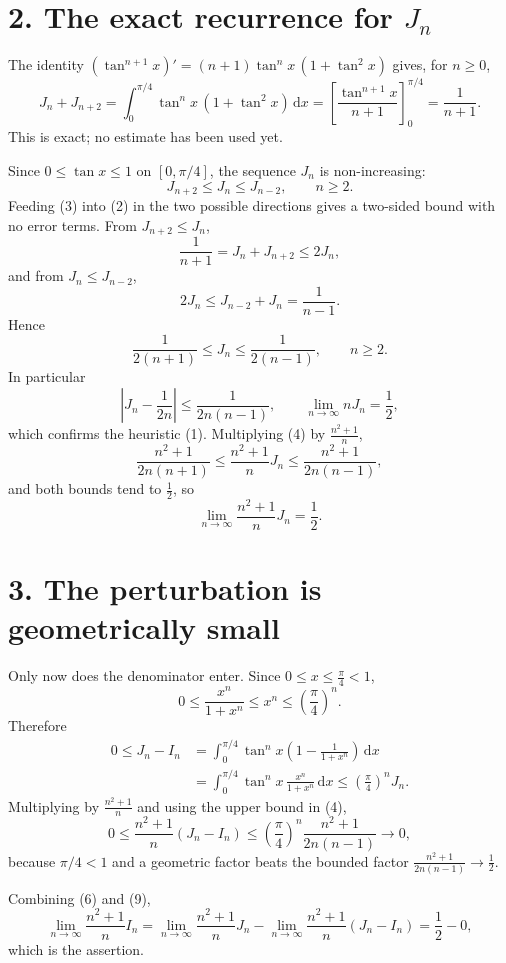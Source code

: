 \documentclass[12pt]{article}
\newcommand{\dd}{\,\mathrm{d}}
\newcommand{\In}{I_n}
\newcommand{\Jn}{J_n}
\begin{document}
\section*{2. The exact recurrence for \(\Jn\)}

The identity \((\tan^{n+1}x)'=(n+1)\tan^n x\,(1+\tan^2x)\) gives, for
\(n\ge0\),
\[
\Jn+J_{n+2}
=\int_0^{\pi/4}\tan^n x\,(1+\tan^2 x)\dd x
=\left[\frac{\tan^{n+1}x}{n+1}\right]_0^{\pi/4}
=\frac1{n+1}.
\tag{2}
\]
This is exact; no estimate has been used yet.

Since \(0\le\tan x\le1\) on \([0,\pi/4]\), the sequence \(\Jn\) is
non-increasing:
\[
J_{n+2}\le \Jn\le J_{n-2},\qquad n\ge2.
\tag{3}
\]
Feeding (3) into (2) in the two possible directions gives a two-sided
bound with no error terms. From \(J_{n+2}\le\Jn\),
\[
\frac1{n+1}=\Jn+J_{n+2}\le 2\Jn,
\]
and from \(\Jn\le J_{n-2}\),
\[
2\Jn\le J_{n-2}+\Jn=\frac1{n-1}.
\]
Hence
\[
\boxed{\displaystyle
\frac1{2(n+1)}\le \Jn\le\frac1{2(n-1)},\qquad n\ge2.}
\tag{4}
\]
In particular
\[
\left|\Jn-\frac1{2n}\right|\le\frac1{2n(n-1)},
\qquad
\lim_{n\to\infty}n\Jn=\frac12,
\tag{5}
\]
which confirms the heuristic (1). Multiplying (4) by
\(\frac{n^2+1}{n}\),
\[
\frac{n^2+1}{2n(n+1)}
\le\frac{n^2+1}{n}\Jn
\le\frac{n^2+1}{2n(n-1)},
\]
and both bounds tend to \(\frac12\), so
\[
\boxed{\displaystyle
\lim_{n\to\infty}\frac{n^2+1}{n}\Jn=\frac12.}
\tag{6}
\]

\section*{3. The perturbation is geometrically small}

Only now does the denominator enter. Since \(0\le x\le\frac\pi4<1\),
\[
0\le\frac{x^n}{1+x^n}\le x^n\le\left(\frac\pi4\right)^n.
\tag{7}
\]
Therefore
\[
\begin{aligned}
0\le \Jn-\In
&=\int_0^{\pi/4}\tan^n x\left(1-\frac1{1+x^n}\right)\dd x\\
&=\int_0^{\pi/4}\tan^n x\,\frac{x^n}{1+x^n}\dd x
\le\left(\frac\pi4\right)^n\Jn.
\end{aligned}
\tag{8}
\]
Multiplying by \(\frac{n^2+1}{n}\) and using the upper bound in (4),
\[
0\le\frac{n^2+1}{n}(\Jn-\In)
\le\left(\frac\pi4\right)^n\frac{n^2+1}{2n(n-1)}
\longrightarrow0,
\tag{9}
\]
because \(\pi/4<1\) and a geometric factor beats the bounded factor
\(\frac{n^2+1}{2n(n-1)}\to\frac12\).

Combining (6) and (9),
\[
\lim_{n\to\infty}\frac{n^2+1}{n}\In
=\lim_{n\to\infty}\frac{n^2+1}{n}\Jn
-\lim_{n\to\infty}\frac{n^2+1}{n}(\Jn-\In)
=\frac12-0,
\]
which is the assertion.
\end{document}
